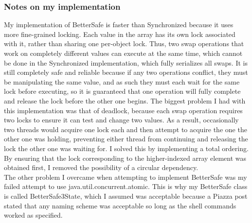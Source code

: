 \documentclass[letterpaper,twocolumn,10pt]{article}
\begin{document}
\subsubsection{Notes on my implementation}
My implementation of BetterSafe is faster than Synchronized because it uses more fine-grained locking. Each value in the array has its own lock associated with it, rather than sharing one per-object lock. Thus, two swap operations that work on completely different values can execute at the same time, which cannot be done in the Synchronized implementation, which fully serializes all swaps. It is still completely safe and reliable because if any two operations conflict, they must be manipulating the same value, and as such they must each wait for the same lock before executing, so it is guaranteed that one operation will fully complete and release the lock before the other one begins. The biggest problem I had with this implementation was that of deadlock, because each swap operation requires two locks to ensure it can test and change two values. As a result, occasionally two threads would acquire one lock each and then attempt to acquire the one the other one was holding, preventing either thread from continuing and releasing the lock the other one was waiting for. I solved this by implementing a total ordering. By ensuring that the lock corresponding to the higher-indexed array element was obtained first, I removed the possibility of a circular dependency. \\
The other problem I overcame when attempting to implement BetterSafe was my failed attempt to use java.util.concurrent.atomic. This is why my BetterSafe class is called BetterSafe3State, which I assumed was acceptable because a Piazza post stated that any naming scheme was acceptable so long as the shell commands worked as specified.
\end{document}
